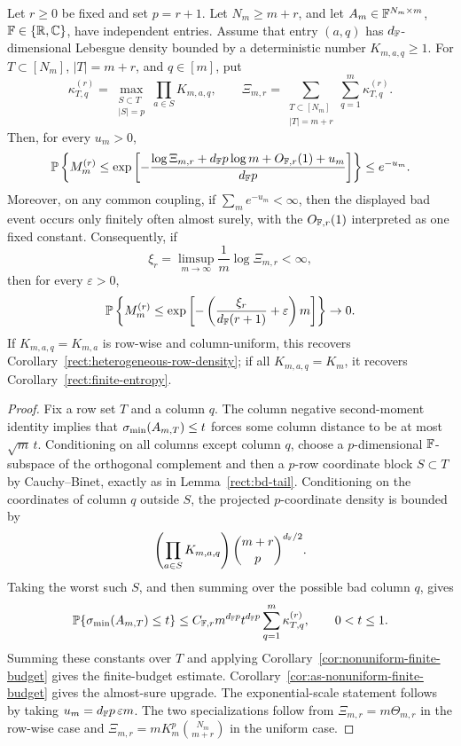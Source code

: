 \begin{corollary}\label{rect:entrywise-heterogeneous-fixed-excess}
Let \(r\ge0\) be fixed and set \(p=r+1\).  Let \(N_m\ge m+r\), and let
\(A_m\in\mathbb{F}^{N_m\times m}\), \(\mathbb{F}\in\{\mathbb{R},\mathbb{C}\}\), have independent entries.
Assume that entry \((a,q)\) has \(d_{\mathbb{F}}\)-dimensional Lebesgue density bounded
by a deterministic number \(K_{m,a,q}\ge1\).  For \(T\subset[N_m]\),
\(|T|=m+r\), and \(q\in[m]\), put
\[
  \kappa_{T,q}^{(r)}
  =
  \max_{\substack{S\subset T\\ |S|=p}}
  \prod_{a\in S}K_{m,a,q},
  \qquad
  \Xi_{m,r}
  =
  \sum_{\substack{T\subset[N_m]\\ |T|=m+r}}
  \sum_{q=1}^{m}\kappa_{T,q}^{(r)} .
\]
Then, for every \(u_m>0\),
\[
  \mathbb{P}\left\{
  M_m^{(r)}\le
  \exp\left[-\frac{\log\Xi_{m,r}+d_{\mathbb{F}} p\log m+O_{\mathbb{F},r}(1)+u_m}
  {d_{\mathbb{F}} p}\right]\right\}
  \le e^{-u_m}.
\]
Moreover, on any common coupling, if \(\sum_m e^{-u_m}<\infty\), then the
displayed bad event occurs only finitely often almost surely, with the
\(O_{\mathbb{F},r}(1)\) interpreted as one fixed constant.
Consequently, if
\[
  \xi_r=\limsup_{m\to\infty}\frac1m\log\Xi_{m,r}<\infty,
\]
then for every \(\varepsilon>0\),
\[
  \mathbb{P}\left\{
  M_m^{(r)}
  \le \exp\left[-\left(\frac{\xi_r}{d_{\mathbb{F}}(r+1)}+\varepsilon\right)m\right]
  \right\}\to0 .
\]
If \(K_{m,a,q}=K_{m,a}\) is row-wise and column-uniform, this recovers
Corollary~\ref{rect:heterogeneous-row-density}; if all \(K_{m,a,q}=K_m\), it
recovers Corollary~\ref{rect:finite-entropy}.
\end{corollary}

\begin{proof}
Fix a row set \(T\) and a column \(q\).  The column negative second-moment
identity implies that \(\sigma_{\min}(A_{m,T})\le t\) forces some column distance to be
at most \(\sqrt m\,t\).  Conditioning on all columns except column \(q\), choose
a \(p\)-dimensional \(\mathbb{F}\)-subspace of the orthogonal complement and then a
\(p\)-row coordinate block \(S\subset T\) by Cauchy--Binet, exactly as in
Lemma~\ref{rect:bd-tail}.  Conditioning on the coordinates of column \(q\)
outside \(S\), the projected \(p\)-coordinate density is bounded by
\[
  \left(\prod_{a\in S}K_{m,a,q}\right)\binom{m+r}{p}^{d_{\mathbb{F}}/2}.
\]
Taking the worst such \(S\), and then summing over the possible bad column
\(q\), gives
\[
  \mathbb{P}\{\sigma_{\min}(A_{m,T})\le t\}
  \le
  C_{\mathbb{F},r}m^{d_{\mathbb{F}} p}t^{d_{\mathbb{F}} p}
  \sum_{q=1}^{m}\kappa_{T,q}^{(r)},\qquad 0<t\le1.
\]
Summing these constants over \(T\) and applying
Corollary~\ref{cor:nonuniform-finite-budget} gives the finite-budget estimate.
Corollary~\ref{cor:as-nonuniform-finite-budget} gives the almost-sure upgrade.
The exponential-scale statement follows by taking
\(u_m=d_{\mathbb{F}} p\,\varepsilon m\).  The two specializations follow from
\(\Xi_{m,r}=m\Theta_{m,r}\) in the row-wise case and
\(\Xi_{m,r}=mK_m^p\binom{N_m}{m+r}\) in the uniform case.
\end{proof}

